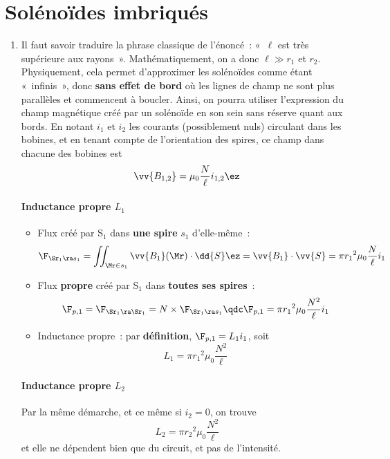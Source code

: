 \documentclass[a4paper, 10pt, final, garamond]{book}
\begin{document}
\section{Solénoïdes imbriqués}
\label{sec:solimbcorr}
\begin{enumerate}
	\item Il faut savoir traduire la phrase classique de l'énoncé~: «~$\ell$ est
	      très supérieure aux rayons~». Mathématiquement, on a donc $\ell \gg r_1$
	      et $r_2$. Physiquement, cela permet d'approximer les solénoïdes comme
	      étant «~infinis~», donc \textbf{sans effet de bord} où les lignes de
	      champ ne sont plus parallèles et commencent à boucler. Ainsi, on pourra
	      utiliser l'expression du champ magnétique créé par un solénoïde en son
	      sein sans réserve quant aux bords.
	      \bigbreak
	      En notant $i_1$ et $i_2$ les courants (possiblement nuls) circulant dans
	      les bobines, et en tenant compte de l'orientation des spires, ce champ
	      dans chacune des bobines est
	      \[
		      \vv{B_{1,2}} = \mu_0 \frac{N}{\ell} i_{1,2} \ez
	      \]
	      \paragraph*{Inductance propre $L_1$}
	      \begin{itemize}
		      \item Flux créé par S$_1$ dans \textbf{une spire} $s_1$ d'elle-même~:
		            \[
			            \F_{\Sr_1 \ra s_1}
			            = \iint _{\Mr \in s_1} \vv{B_1}(\Mr) \cdot \dd{S}\ez
			            = \vv{B_1}\cdot \vv{S}
			            = \pi r_1{}^{2} \mu_0 \frac{N}{\ell}i_1
		            \]
		      \item Flux \textbf{propre} créé par S$_1$ dans \textbf{toutes ses
			            spires}~:
		            \[
			            \F_{p,1} = \F_{\Sr_1 \ra \Sr_1} = N \times \F_{\Sr_1 \ra s_1}
			            \qdc
			            \F_{p,1} = \pi r_1{}^{2} \mu_0 \frac{N^2}{\ell}i_1
		            \]
		      \item Inductance propre~: par \textbf{définition}, $\F_{p,1} =
			            L_1i_1$, soit
		            \[
			            \boxed{L_1 = \pi r_1{}^{2} \mu_0 \frac{N^2}{\ell}}
		            \]
	      \end{itemize}
	      \paragraph*{Inductance propre $L_2$}
	      Par la même démarche, et ce même si $i_2 = 0$, on trouve
	      \[
		      \boxed{L_2 = \pi r_2{}^{2}\mu_0 \frac{N^2}{\ell}}
	      \]
	      et elle ne dépendent bien que du circuit, et pas de l'intensité.

\end{enumerate}
\end{document}
